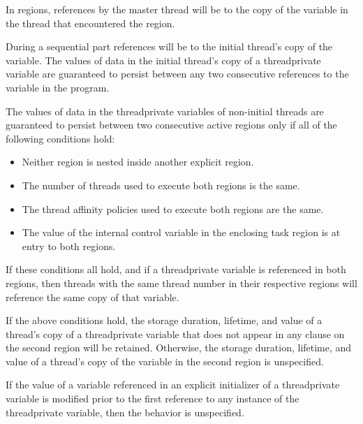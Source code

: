 {{{{In  regions, references by the master thread will be to the copy of the 
variable in the thread that encountered the  region. 

During a sequential part references will be to the initial thread’s copy of the variable. 
The values of data in the initial thread’s copy of a threadprivate variable are guaranteed 
to persist between any two consecutive references to the variable in the program. 

\pagebreak

The values of data in the threadprivate variables of non-initial threads 
are guaranteed to persist between two consecutive active  
regions only if all of the following conditions hold:

\begin{itemize}  %
\item Neither  region is nested inside another explicit  region. 

\item The number of threads used to execute both  regions is the same. 

\item The thread affinity policies used to execute both  regions are the same. 

\item The value of the  internal control variable in the enclosing task region is  
at entry to both  regions.
\end{itemize} %

If these conditions all hold, and if a threadprivate variable is referenced in both regions, 
then threads with the same thread number in their respective regions will reference the 
same copy of that variable.

\ccppspecificstart
If the above conditions hold, the storage duration, lifetime, and value of a thread’s copy 
of a threadprivate variable that does not appear in any  clause on the second 
region will be retained. Otherwise, the storage duration, lifetime, and value of a thread’s 
copy of the variable in the second region is unspecified.

If the value of a variable referenced in an explicit initializer of a threadprivate variable 
is modified prior to the first reference to any instance of the threadprivate variable, then 
the behavior is unspecified. 
\ccppspecificend

}}}}

